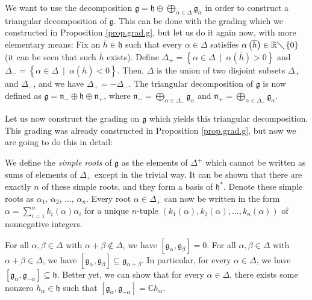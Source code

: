 \documentclass
[numbers=enddot,12pt,final,onecolumn,german,notitlepage]{scrartcl}%
\theoremstyle{definition}
\begin{document}
We want to use the decomposition $\mathfrak{g}=\mathfrak{h}\oplus
\bigoplus\limits_{\alpha\in\Delta}\mathfrak{g}_{\alpha}$ in order to construct
a triangular decomposition of $\mathfrak{g}$. This can be done with the
grading which we constructed in Proposition \ref{prop.grad.g}, but let us do
it again now, with more elementary means: Fix an $\overline{h}\in\mathfrak{h}$
such that every $\alpha\in\Delta$ satisfies $\alpha\left(  \overline
{h}\right)  \in\mathbb{R}\diagdown\left\{  0\right\}  $ (it can be seen that
such $\overline{h}$ exists). Define $\Delta_{+}=\left\{  \alpha\in\Delta
\ \mid\ \alpha\left(  \overline{h}\right)  >0\right\}  $ and $\Delta
_{-}=\left\{  \alpha\in\Delta\ \mid\ \alpha\left(  \overline{h}\right)
<0\right\}  $. Then, $\Delta$ is the union of two disjoint subsets $\Delta
_{+}$ and $\Delta_{-}$, and we have $\Delta_{+}=-\Delta_{-}$. The triangular
decomposition of $\mathfrak{g}$ is now defined as $\mathfrak{g}=\mathfrak{n}%
_{-}\oplus\mathfrak{h}\oplus\mathfrak{n}_{+}$, where $\mathfrak{n}%
_{-}=\bigoplus\limits_{\alpha\in\Delta_{-}}\mathfrak{g}_{\alpha}$ and
$\mathfrak{n}_{+}=\bigoplus\limits_{\alpha\in\Delta_{+}}\mathfrak{g}_{\alpha}$.

Let us now construct the grading on $\mathfrak{g}$ which yields this
triangular decomposition. This grading was already constructed in Proposition
\ref{prop.grad.g}, but now we are going to do this in detail:

We define the \textit{simple roots} of $\mathfrak{g}$ as the elements of
$\Delta^{+}$ which cannot be written as sums of elements of $\Delta_{+}$
except in the trivial way. It can be shown that there are exactly $n$ of these
simple roots, and they form a basis of $\mathfrak{h}^{\ast}$. Denote these
simple roots as $\alpha_{1}$, $\alpha_{2}$, $...$, $\alpha_{n}$. Every root
$\alpha\in\Delta_{+}$ can now be written in the form $\alpha=\sum
\limits_{i=1}^{n}k_{i}\left(  \alpha\right)  \alpha_{i}$ for a unique
$n$-tuple $\left(  k_{1}\left(  \alpha\right)  ,k_{2}\left(  \alpha\right)
,...,k_{n}\left(  \alpha\right)  \right)  $ of nonnegative integers.

For all $\alpha,\beta\in\Delta$ with $\alpha+\beta\notin\Delta$, we have
$\left[  \mathfrak{g}_{\alpha},\mathfrak{g}_{\beta}\right]  =0$. For all
$\alpha,\beta\in\Delta$ with $\alpha+\beta\in\Delta$, we have $\left[
\mathfrak{g}_{\alpha},\mathfrak{g}_{\beta}\right]  \subseteq\mathfrak{g}%
_{\alpha+\beta}$. In particular, for every $\alpha\in\Delta$, we have $\left[
\mathfrak{g}_{\alpha},\mathfrak{g}_{-\alpha}\right]  \subseteq\mathfrak{h}$.
Better yet, we can show that for every $\alpha\in\Delta$, there exists some
nonzero $h_{\alpha}\in\mathfrak{h}$ such that $\left[  \mathfrak{g}_{\alpha
},\mathfrak{g}_{-\alpha}\right]  =\mathbb{C}h_{\alpha}$.
\end{document}
